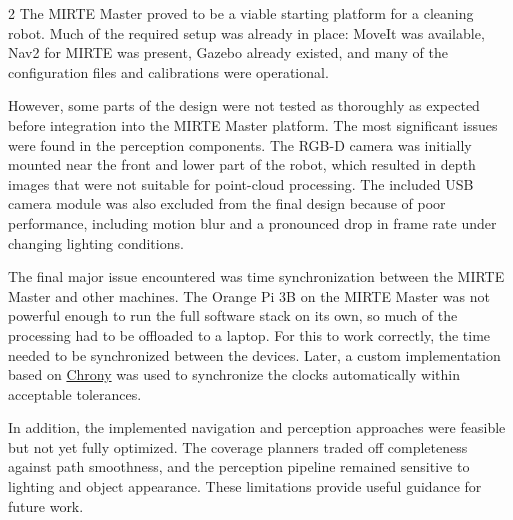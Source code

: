 \documentclass{article}
\begin{document}
\begin{multicols}{2}
The MIRTE Master proved to be a viable starting platform for a cleaning robot. Much of the required setup was already in place: MoveIt was available, Nav2 for MIRTE was present, Gazebo already existed, and many of the configuration files and calibrations were operational.

However, some parts of the design were not tested as thoroughly as expected before integration into the MIRTE Master platform. The most significant issues were found in the perception components. The RGB-D camera was initially mounted near the front and lower part of the robot, which resulted in depth images that were not suitable for point-cloud processing. The included USB camera module was also excluded from the final design because of poor performance, including motion blur and a pronounced drop in frame rate under changing lighting conditions.

The final major issue encountered was time synchronization between the MIRTE Master and other machines. The Orange Pi 3B on the MIRTE Master was not powerful enough to run the full software stack on its own, so much of the processing had to be offloaded to a laptop. For this to work correctly, the time needed to be synchronized between the devices. Later, a custom implementation based on \href{https://chrony-project.org/}{Chrony} was used to synchronize the clocks automatically within acceptable tolerances.

In addition, the implemented navigation and perception approaches were feasible but not yet fully optimized. The coverage planners traded off completeness against path smoothness, and the perception pipeline remained sensitive to lighting and object appearance. These limitations provide useful guidance for future work.


\end{multicols}

%

%
% 
% 
% 
% 
% 
% 
% 
% 
% 
% 
% 
% 
%
\end{document}
